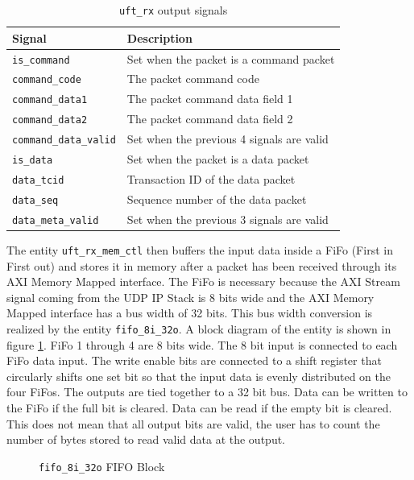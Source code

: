 \begin{table}[h!]
    \centering
    \begin{tabular}{l l}
        \toprule
        Signal & Description \\
        \midrule
        \texttt{is\_command}         & Set when the packet is a command packet\\
        \texttt{command\_code}       & The packet command code\\
        \texttt{command\_data1}      & The packet command data field 1\\
        \texttt{command\_data2}      & The packet command data field 2\\
        \texttt{command\_data\_valid} & Set when the previous 4 signals are valid\\
        \texttt{is\_data}            & Set when the packet is a data packet\\
        \texttt{data\_tcid}          & Transaction ID of the data packet\\
        \texttt{data\_seq}           & Sequence number of the data packet\\
        \texttt{data\_meta\_valid}    & Set when the previous 3 signals are valid\\
        \bottomrule
    \end{tabular}
    \caption{\texttt{uft\_rx} output signals}
    \label{tab:uftrxsig}
\end{table}

The entity \texttt{uft\_rx\_mem\_ctl} then buffers the input data inside a FiFo (First
in First out) and stores it in memory after a packet has been received through its AXI
Memory Mapped interface. The FiFo is necessary because the AXI Stream signal
coming from the UDP IP Stack is 8 bits wide and the AXI Memory Mapped interface
has a bus width of 32 bits. This bus width conversion is realized by the entity
\texttt{fifo\_8i\_32o}. A block diagram of the entity is shown in figure \ref{fig:8to32fifo}. 
FiFo 1 through 4 are 8 bits wide. The 8 bit input is 
connected to each FiFo data input. The write enable bits are connected to a
shift register that circularly shifts one set bit so that the input data is
evenly distributed on the four FiFos. The outputs are tied together to a 32 bit
bus. Data can be written to the FiFo if the full bit is cleared. Data can be
read if the empty bit is cleared. This does not mean that all output bits are
valid, the user has to count the number of bytes stored to read valid data at
the output.
\\
\begin{figure}[tb!]
    \centering
    \begin{adjustbox}{max width=\textwidth}
        
    \end{adjustbox}
    \caption{\texttt{fifo\_8i\_32o} FIFO Block}
    \label{fig:8to32fifo}
\end{figure}

